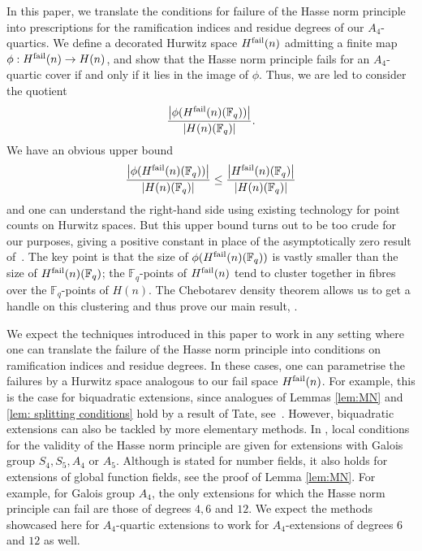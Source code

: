 \documentclass{amsart}
\numberwithin{equation}{section} \numberwithin{figure}{section}
\newcommand\FF{\mathbb{F}}
\theoremstyle{one}
\theoremstyle{definition}
\begin{document}
In this paper, we translate the conditions for failure of the Hasse norm principle into prescriptions for the ramification indices and residue degrees of our $A_4$-quartics. We define a decorated Hurwitz space $H^{\rm fail}(n)$ admitting a finite map $\phi: H^{\rm fail}(n) \to H(n)$, and show that the Hasse norm principle fails for an $A_4$-quartic cover if and only if it lies in the image of $\phi$. Thus, we are led to consider the quotient 
\[\frac{\left|\phi(H^{\rm fail}(n)(\FF_q))\right|}{\left|H(n)(\FF_q)\right|}.\]
We have an obvious upper bound \[ \frac{\left|\phi(H^{\rm fail}(n)(\FF_q))\right|}{\left|H(n)(\FF_q)\right|} \leq \frac{\left|H^{\rm fail}(n)(\FF_q)\right|}{\left|H(n)(\FF_q)\right|}\]
and one can understand the right-hand side using existing technology for point counts on
Hurwitz spaces. But this upper bound turns out to be too crude for our purposes, giving a positive constant in place of the asymptotically zero result of~. The key point is that the size of $\phi(H^{\rm fail}(n)(\FF_q))$ is vastly smaller than the size of $H^{\rm fail}(n)(\FF_q)$; the
$\FF_q$-points of $H^{\rm fail}(n)$ tend to cluster together in fibres over the $\FF_q$-points of $H(n)$. The Chebotarev density theorem allows us to get a handle on this clustering and thus prove our main result, . 

We expect the techniques introduced in this paper to work in any setting where one can translate the failure of the Hasse norm principle into conditions on ramification indices and residue degrees.  In these cases, one can parametrise the failures by a 
Hurwitz space analogous to our fail space $H^{\rm fail}(n)$. For example, this is the case for biquadratic extensions, since analogues of Lemmas \ref{lem:MN} and \ref{lem: splitting conditions} hold by a result of Tate, see~\cite[p.198]{cas.fro:67}. However, biquadratic extensions can also be tackled by more elementary methods. In \cite[Proposition 1.8]{mac.new:22}, local conditions for the validity of the Hasse norm principle are given for extensions with Galois group $S_4,S_5,A_4$ or $A_5$. 
Although \cite[Proposition 1.8]{mac.new:22} is stated for number fields, it also holds for extensions of global function fields, see the proof of Lemma \ref{lem:MN}. For example, for Galois group $A_4$, the only extensions for which the Hasse norm principle can fail are those of degrees $4, 6$ and $12$. We expect the methods showcased here for $A_4$-quartic extensions to work for $A_4$-extensions of degrees $6$ and $12$ as well. 
\end{document}
